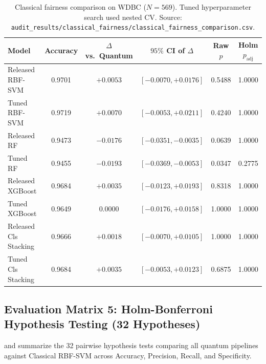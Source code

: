 \begin{table}[H]
\centering
\small
\caption{Classical fairness comparison on WDBC ($N=569$). Tuned hyperparameter search used nested CV. Source: \texttt{audit\_results/classical\_fairness/classical\_fairness\_comparison.csv}.}
\label{tab:classical-fairness-full}
\begin{tabularx}{\textwidth}{lccccc}
\toprule
\textbf{Model} & \textbf{Accuracy} & \textbf{$\Delta$ vs.\ Quantum} & \textbf{$95\%$ CI of $\Delta$} & \textbf{Raw $p$} & \textbf{Holm $p_{\mathrm{adj}}$} \\
\midrule
Released RBF-SVM      & 0.9701 & $+0.0053$ & $[-0.0070, +0.0176]$ & 0.5488 & 1.0000 \\
Tuned RBF-SVM         & 0.9719 & $+0.0070$ & $[-0.0053, +0.0211]$ & 0.4240 & 1.0000 \\
Released RF           & 0.9473 & $-0.0176$ & $[-0.0351, -0.0035]$ & 0.0639 & 1.0000 \\
Tuned RF              & 0.9455 & $-0.0193$ & $[-0.0369, -0.0053]$ & 0.0347 & 0.2775 \\
Released XGBoost      & 0.9684 & $+0.0035$ & $[-0.0123, +0.0193]$ & 0.8318 & 1.0000 \\
Tuned XGBoost         & 0.9649 & $0.0000$  & $[-0.0176, +0.0158]$ & 1.0000 & 1.0000 \\
Released Cls Stacking & 0.9666 & $+0.0018$ & $[-0.0070, +0.0105]$ & 1.0000 & 1.0000 \\
Tuned Cls Stacking    & 0.9684 & $+0.0035$ & $[-0.0053, +0.0123]$ & 0.6875 & 1.0000 \\
\bottomrule
\end{tabularx}
\end{table}

\subsection{Evaluation Matrix 5: Holm-Bonferroni Hypothesis Testing (32 Hypotheses)}
 and  summarize the 32 pairwise hypothesis tests comparing all quantum pipelines against Classical RBF-SVM across Accuracy, Precision, Recall, and Specificity.

